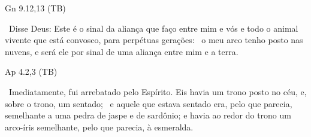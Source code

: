 \documentclass[12pt,aspectratio=169]{beamer}
\newcommand{\ver}[1]{%
    \raisebox{0.50ex}{%
        \scalebox{1.1}{%
            \pmb{\textbf{\textcolor{BSpbg}{#1}}}%
        }%
    }%
}
\newcommand{\QUOTE}[1]{%
    \par\noindent\hspace*{0.05\linewidth}%
    \begin{minipage}{0.9\linewidth}%
        \linespread{1.35}\large{#1}%
    \end{minipage}%
}
\newcommand{\YEL}[1]{{\textcolor{TXyel}{#1}}}
\newcommand{\GRE}[1]{{\textcolor{TXgre}{#1}}}
\newcommand{\BRI}[1]{{\textcolor{BSpbg}{#1}}}   %
\begin{document}
    \begin{frame}{Gn 9.12,13 (TB)}
        \QUOTE{%
            \ver{12}~Disse Deus: Este é o \YEL{sinal da aliança} que faço entre mim e vós e todo
            o animal vivente que está convosco, para \YEL{perpétuas gerações}:
            \ver{13}~\YEL{o meu arco} tenho posto nas nuvens, e será ele por sinal de uma
            aliança entre mim e a terra.
        }
    \end{frame}

    {
    \begin{frame}{Ap 4.2,3 (TB)}
        \QUOTE{\BRI{%
            \ver{2}~Imediatamente, fui arrebatado pelo Espírito. Eis havia um \YEL{trono posto
            no céu}, e, sobre o trono, um sentado;
            \ver{3}~e aquele que estava sentado era, pelo que parecia, semelhante a uma pedra de
            jaspe e de sardônio; e \YEL{havia ao redor do trono um arco-íris} semelhante, pelo
            que parecia, à \GRE{esmeralda}.
        }}
    \end{frame}}

\end{document}
